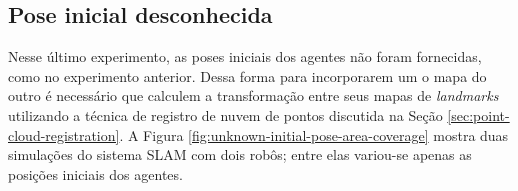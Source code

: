 



\subsection{Pose inicial desconhecida}
\label{sec:exp-unknown-initial-pose}
Nesse último experimento, as poses iniciais dos agentes não foram 
fornecidas, como no experimento anterior. Dessa forma para incorporarem 
um o mapa do outro é necessário que calculem a transformação entre seus 
mapas de \textit{landmarks} utilizando a técnica de registro de nuvem de 
pontos discutida na Seção \ref{sec:point-cloud-registration}. A Figura 
\ref{fig:unknown-initial-pose-area-coverage} mostra duas simulações do 
sistema SLAM com dois robôs; entre elas variou-se apenas as posições 
iniciais dos agentes.

